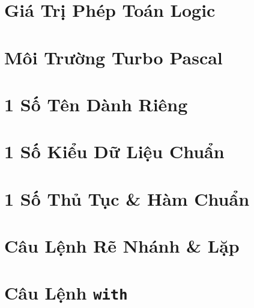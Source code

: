 \documentclass[oneside]{book}
\numberwithin{equation}{section}
\begin{document}

\section{Giá Trị Phép Toán Logic}


\section{Môi Trường Turbo Pascal}


\section{1 Số Tên Dành Riêng}


\section{1 Số Kiểu Dữ Liệu Chuẩn}


\section{1 Số Thủ Tục \& Hàm Chuẩn}


\section{Câu Lệnh Rẽ Nhánh \& Lặp}


\section{Câu Lệnh \texttt{with}}

\end{document}
